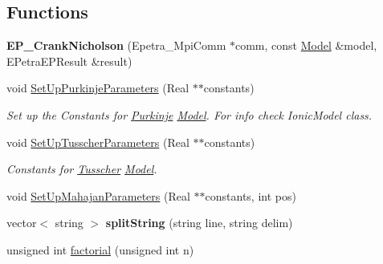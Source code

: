 \subsection*{Functions}
\begin{DoxyCompactItemize}
\item 
\hypertarget{namespacevoom_af2702eef77261bb83ce6aa820c102d1a}{
{\bfseries EP\_\-CrankNicholson} (Epetra\_\-MpiComm $\ast$comm, const \hyperlink{classvoom_1_1_model}{Model} \&model, EPetraEPResult \&result)}
\label{namespacevoom_af2702eef77261bb83ce6aa820c102d1a}

\item 
\hypertarget{namespacevoom_af0e86d2e771c9c29467a049181e64ccd}{
void \hyperlink{namespacevoom_af0e86d2e771c9c29467a049181e64ccd}{SetUpPurkinjeParameters} (Real $\ast$$\ast$constants)}
\label{namespacevoom_af0e86d2e771c9c29467a049181e64ccd}

\begin{DoxyCompactList}\small\item\em Set up the Constants for \hyperlink{classvoom_1_1_purkinje}{Purkinje} \hyperlink{classvoom_1_1_model}{Model}. For info check IonicModel class. \item\end{DoxyCompactList}\item 
\hypertarget{namespacevoom_a4889fa799c04dc67ff9ea0c72cd3885b}{
void \hyperlink{namespacevoom_a4889fa799c04dc67ff9ea0c72cd3885b}{SetUpTusscherParameters} (Real $\ast$$\ast$constants)}
\label{namespacevoom_a4889fa799c04dc67ff9ea0c72cd3885b}

\begin{DoxyCompactList}\small\item\em Constants for \hyperlink{classvoom_1_1_tusscher}{Tusscher} \hyperlink{classvoom_1_1_model}{Model}. \item\end{DoxyCompactList}\item 
void \hyperlink{namespacevoom_a72a608e668a052d7b2a6f26a6e286702}{SetUpMahajanParameters} (Real $\ast$$\ast$constants, int pos)
\item 
\hypertarget{namespacevoom_a577e52aca11c2b782ad730edf75ba2a2}{
vector$<$ string $>$ {\bfseries splitString} (string line, string delim)}
\label{namespacevoom_a577e52aca11c2b782ad730edf75ba2a2}

\item 
\hypertarget{namespacevoom_a00cddb89f6ad03be4ca8db5515fa5615}{
unsigned int \hyperlink{namespacevoom_a00cddb89f6ad03be4ca8db5515fa5615}{factorial} (unsigned int n)}
\label{namespacevoom_a00cddb89f6ad03be4ca8db5515fa5615}


\end{DoxyCompactItemize}
